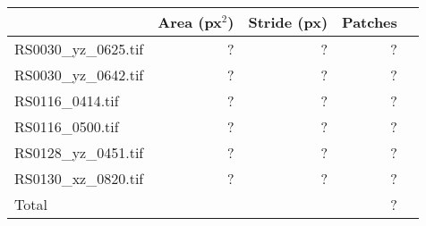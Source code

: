 \begin{tabular}{@{}lrrrr@{}}
\toprule
                        &   Area (px$^2$)   &   Stride (px) &   Patches     \\  \midrule
RS0030\_yz\_0625.tif    &   ?               &   ?           &   ?           \\
RS0030\_yz\_0642.tif    &   ?               &   ?           &   ?           \\
RS0116\_0414.tif        &   ?               &   ?           &   ?           \\
RS0116\_0500.tif        &   ?               &   ?           &   ?           \\
RS0128\_yz\_0451.tif    &   ?               &   ?           &   ?           \\
RS0130\_xz\_0820.tif    &   ?               &   ?           &   ?           \\  \midrule
Total                   &                   &               &   ?           \\  \bottomrule
\end{tabular}